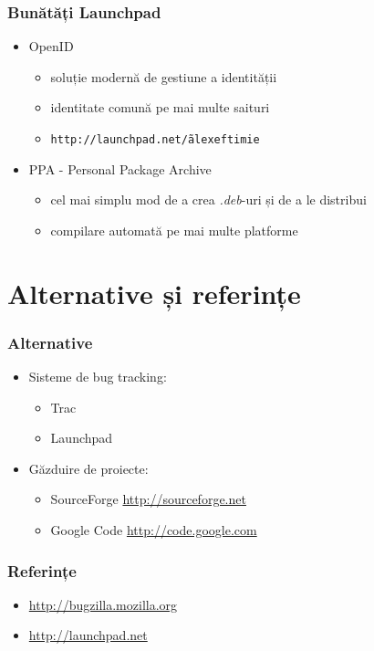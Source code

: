 \documentclass{beamer}
\begin{document}
\begin{frame}
\frametitle{Bunătăți Launchpad}
\begin{itemize}
\item OpenID
\begin{itemize}
\item soluție modernă de gestiune a identității
\item identitate comună pe mai multe saituri
\item \texttt{http://launchpad.net/\~alexeftimie}
\end{itemize}
\item PPA - Personal Package Archive
\begin{itemize}
\item cel mai simplu mod de a crea \emph{.deb}-uri și de a le distribui
\item compilare automată pe mai multe platforme
\end{itemize}
\end{itemize}
\end{frame}

\section {Alternative și referințe}
\frame{\tableofcontents[currentsection]}

\begin{frame}
\frametitle{Alternative}
\begin{itemize}
\item Sisteme de bug tracking:
\begin{itemize}
\item Trac
\item Launchpad
\end{itemize}
\item Găzduire de proiecte:
\begin{itemize}
\item SourceForge \url{http://sourceforge.net}
\item Google Code \url{http://code.google.com}
\end{itemize}
\end{itemize}
\end{frame}

\begin{frame}
\frametitle{Referințe}
\begin{itemize}
\item \url{http://bugzilla.mozilla.org}
\item \url{http://launchpad.net}
\end{itemize}
\end{frame}
\end{document}

